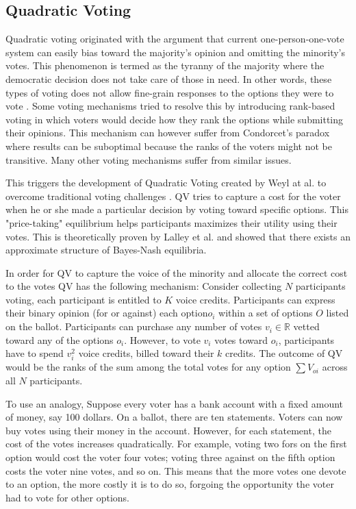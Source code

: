 \subsection{Quadratic Voting}
Quadratic voting originated 
with the argument
that current one-person-one-vote system
can easily bias toward the majority's opinion
and omitting the minority's votes\cite{posner2018radical}.
This phenomenon is termed as the tyranny of the majority
where the democratic decision 
does not take care of those in need.
In other words, these types of voting
does not allow fine-grain responses
to the options they were to vote \cite{sep-voting-methods}.
Some voting mechanisms tried to resolve this
by introducing rank-based voting 
in which voters would decide
how they rank the options
while submitting their opinions.
This mechanism can however
suffer from Condorcet's paradox 
where results can be suboptimal 
because the ranks of the voters
might not be transitive\cite{sep-voting-methods}.
Many other voting mechanisms suffer from similar issues.

This triggers the development of Quadratic Voting
created by Weyl at al. 
to overcome traditional voting challenges \cite{posner2018radical}.
QV tries to capture a cost 
for the voter when he or she
made a particular decision by voting toward specific options.
This "price-taking" equilibrium helps
participants maximizes their utility using their votes.
This is theoretically proven by Lalley et al. \cite{lalley2018quadratic}
and showed that there exists an approximate structure of Bayes-Nash equilibria.

In order for QV to capture the voice of the minority
and allocate the correct cost to the votes
QV has the following mechanism:
Consider collecting $N$ participants voting,
each participant is entitled to 
$K$ voice credits.
Participants can express their binary opinion 
(for or against)
each option$o_i$ within a set of options $O$ listed on the ballot. 
Participants can purchase any number of votes $v_i \in \mathbb{R}$
vetted toward any of the options $o_i$.
However, to vote $v_i$ votes toward $o_i$,
participants have to spend $v_i^2$ voice credits,
billed toward their $k$ credits.
The outcome of QV 
would be the ranks of the sum
among the total votes for any option $\sum{V_{oi}}$
across all $N$ participants.

To use an analogy,
Suppose every voter has a bank account 
with a fixed amount of money, say 100 dollars.
On a ballot, there are ten statements.
Voters can now buy votes using their money in the account.
However, for each statement, the cost of the votes
increases quadratically. 
For example, voting two fors on the first option 
would cost the voter four votes;
voting three against on the fifth option 
costs the voter nine votes, and so on.
This means that the more votes one devote to an option,
the more costly it is to do so,
forgoing the opportunity the voter had
to vote for other options.

